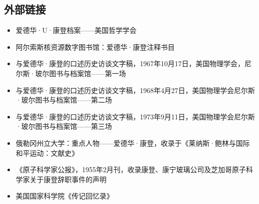 \subsection{外部链接}
\begin{itemize}
\item 爱德华·U·康登档案——美国哲学学会
\item 阿尔索斯核资源数字图书馆：爱德华·康登注释书目
\item 与爱德华·康登的口述历史访谈文字稿，1967年10月17日，美国物理学会，尼尔斯·玻尔图书与档案馆——第一场
\item 与爱德华·康登的口述历史访谈文字稿，1968年4月27日，美国物理学会尼尔斯·玻尔图书与档案馆——第二场
\item 与爱德华·康登的口述历史访谈文字稿，1973年9月11日，美国物理学会尼尔斯·玻尔图书与档案馆——第三场
\item 俄勒冈州立大学：重点人物——爱德华·康登，收录于《莱纳斯·鲍林与国际和平运动：文献史》
\item 《原子科学家公报》，1955年2月刊，收录康登、康宁玻璃公司及芝加哥原子科学家关于康登辞职事件的声明
\item 美国国家科学院《传记回忆录》
\end{itemize}
